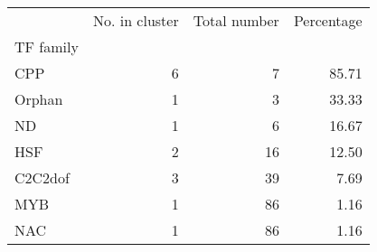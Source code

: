 \begin{tabular}{lrrr}
\toprule
{} &  No. in cluster &  Total number &  Percentage \\
TF family &                 &               &             \\
\midrule
CPP       &               6 &             7 &       85.71 \\
Orphan    &               1 &             3 &       33.33 \\
ND        &               1 &             6 &       16.67 \\
HSF       &               2 &            16 &       12.50 \\
C2C2dof   &               3 &            39 &        7.69 \\
MYB       &               1 &            86 &        1.16 \\
NAC       &               1 &            86 &        1.16 \\
\bottomrule
\end{tabular}
